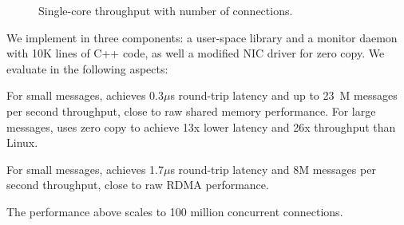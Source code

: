 \begin{figure}[t!]
\begin{minipage}{.31\textwidth}
		\caption{Single-core throughput with number of connections.}
		\label{fig:eval-connnum-tput}
	\end{minipage}
\vspace{-10pt}
\end{figure}



We implement \sys in three components: a user-space library \libipc{} and a monitor daemon with 10K lines of C++ code, as well a modified NIC driver for zero copy.
We evaluate \sys in the following aspects:

For small messages, \sys achieves 0.3$\mu$s round-trip latency and up to 23~M messages per second throughput, close to raw shared memory performance. For large messages, \sys uses zero copy to achieve 13x lower latency and 26x throughput than Linux.

For small messages, \sys achieves  1.7$\mu$s round-trip latency and 8M messages per second throughput, close to raw RDMA performance.

The performance above scales to 100 million concurrent connections.

